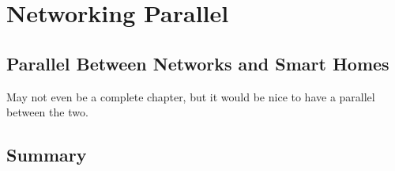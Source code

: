 
\chapter{Networking Parallel}

\section{Parallel Between Networks and Smart Homes}

May not even be a complete chapter, but it would be nice to have a parallel between the two.
	
	
\section{Summary}

